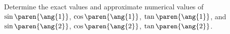 Determine the exact values and approximate numerical values of
$\sin\paren{\ang{1}}$,
$\cos\paren{\ang{1}}$,
$\tan\paren{\ang{1}}$,
and
$\sin\paren{\ang{2}}$,
$\cos\paren{\ang{2}}$,
$\tan\paren{\ang{2}}$.
